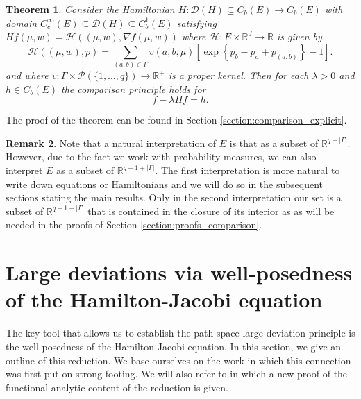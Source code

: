 \documentclass[a4paper]{article}
\newcommand{\cD}{\mathcal{D}}
\newcommand{\cH}{\mathcal{H}}
\newcommand{\cP}{\mathcal{P}}
\newcommand{\bR}{\mathbb{R}}
\numberwithin{equation}{section}
\newtheorem{theorem}{Theorem}[section]
\theoremstyle{definition}
\newtheorem{remark}[theorem]{Remark}
\begin{document}
\begin{theorem} \label{theorem:comparison_principle}
	Consider the Hamiltonian $H : \cD(H) \subseteq C_b( E) \rightarrow C_b(E)$ with domain $C_c^\infty(E) \subseteq \cD(H) \subseteq C_b^1(E)$ satisfying $Hf(\mu,w) = \cH((\mu,w),\nabla f(\mu,w))$ where $\cH : E \times \bR^d \rightarrow \bR$ is given by 
	\begin{equation} \label{eqn:Hamiltonian}
		\cH((\mu,w),p) = \sum_{(a,b) \in \Gamma} v(a,b,\mu)\left[\exp\left\{p_b - p _a + p_{(a,b)} \right\} - 1 \right].
	\end{equation}
	and where $v : \Gamma \times \cP(\{1,\dots,q\}) \rightarrow \bR^+$ is a proper kernel. Then for each $\lambda > 0$ and $h \in C_b(E)$ the comparison principle holds for 
	\begin{equation*}
		f - \lambda H f = h.
	\end{equation*}
\end{theorem}

The proof of the theorem can be found in Section \ref{section:comparison_explicit}.

\begin{remark} \label{remark:dimensionality}
	Note that a natural interpretation of $E$ is that as a subset of $\bR^{q + |\Gamma|}$. However, due to the fact we work with probability measures, we can also interpret $E$ as a subset of $\bR^{q-1 + |\Gamma|}$. The first interpretation is more natural to write down equations or Hamiltonians and we will do so in the subsequent sections stating the main results. Only in the second interpretation our set is a subset of $\bR^{q-1 + |\Gamma|}$  that is contained in the closure of its interior as as will be needed in the proofs of Section \ref{section:proofs_comparison}.
\end{remark}



\section{Large deviations via well-posedness of the Hamilton-Jacobi equation} \label{section:LDP_via_HJ}

The key tool that allows us to establish the path-space large deviation principle is the well-posedness of the Hamilton-Jacobi equation. In this section, we give an outline of this reduction. We base ourselves on the work \cite{FK06} in which this connection was first put on strong footing. We will also refer to \cite{Kr19c} in which a new proof of the functional analytic content of the reduction is given.
\end{document}
